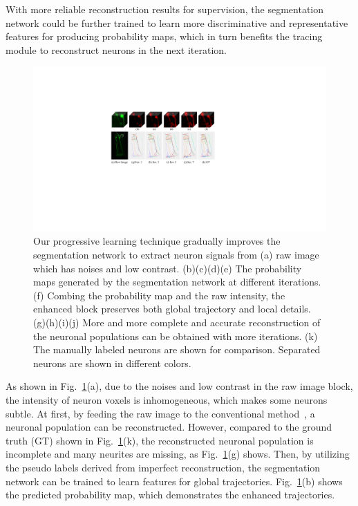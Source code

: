 With more reliable reconstruction results for supervision, the segmentation network could be further trained to learn more discriminative and representative features for producing probability maps, which in turn benefits the tracing module to reconstruct neurons in the next iteration.
\begin{figure}[t]
	\centering
	\includegraphics[width=1\columnwidth]{./Illustrations/ngps.pdf}
	\caption{
		Our progressive learning technique gradually improves the segmentation network to extract neuron signals from (a) raw image which has noises and low contrast. (b)(c)(d)(e) The probability maps generated by the segmentation network at different iterations. (f) Combing the probability map and the raw intensity, the enhanced block preserves both global trajectory and local details. (g)(h)(i)(j) More and more complete and accurate reconstruction of the neuronal populations can be obtained with more iterations. (k) The manually labeled neurons are shown for comparison. Separated neurons are shown in different colors.}
	\label{fig:ngps}
\end{figure}
%
As shown in Fig.~\ref{fig:ngps}(a), due to the noises and low contrast in the raw image block, the intensity of neuron voxels is inhomogeneous, which makes some neurons subtle.
At first, by feeding the raw image to the conventional method~\cite{Quan2015}, a neuronal population can be reconstructed. However, compared to the ground truth (GT) shown in Fig.~\ref{fig:ngps}(k), the reconstructed neuronal population is incomplete and many neurites are missing, as Fig.~\ref{fig:ngps}(g) shows.
Then, by utilizing the pseudo labels derived from imperfect reconstruction, the segmentation network can be trained to learn features for global trajectories. Fig.~\ref{fig:ngps}(b) shows the predicted probability map, which demonstrates the enhanced trajectories.
